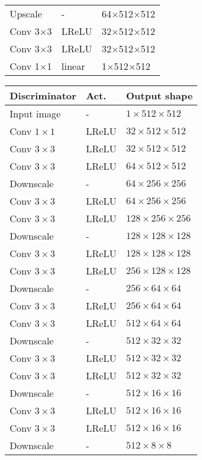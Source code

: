 \documentclass[journal, onecolumn]{IEEEtran}
\begin{document}
\begin{table}[H]
\begin{minipage}[t]{0.48\linewidth}
\begin{adjustbox}{width=0.72\columnwidth,left}
{\begin{tabular}[t]{|lll|}
Upscale          & -      & 64$\times$512$\times$512  \\
Conv 3$\times$3      & LReLU & 32$\times$512$\times$512      \\
Conv 3$\times$3      & LReLU & 32$\times$512$\times$512      \\ 
Conv 1$\times$1      & linear & 1$\times$512$\times$512      \\ \hline
\end{tabular}
}\hfill
\parbox[t][][t]{.4\linewidth}{
\begin{tabular}[t]{|lll|}
\hline
\textbf{Discriminator}       & Act.  & Output shape \\ \hline
Input image  & -      & $1\times512\times512$      \\
Conv $1\times1$      & LReLU & $32\times512\times512$      \\
Conv $3\times3$      & LReLU & $32\times512\times512$      \\ 
Conv $3\times3$      & LReLU & $64\times512\times512$     \\
Downscale & -      & $64\times256\times256$  \\ \hline

Conv $3\times3$      & LReLU & $64\times256\times256$      \\
Conv $3\times3$      & LReLU & $128\times256\times256$      \\ 
Downscale & -      & $128\times128\times128$  \\ \hline

Conv $3\times3$      & LReLU & $128\times128\times128$      \\
Conv $3\times3$      & LReLU & $256\times128\times128$      \\ 
Downscale & -      & $256\times64\times64$  \\ \hline

Conv $3\times3$      & LReLU & $256\times64\times64$      \\
Conv $3\times3$      & LReLU & $512\times64\times64$      \\ 
Downscale & -      & $512\times32\times32$  \\ \hline

Conv $3\times3$      & LReLU & $512\times32\times32$      \\
Conv $3\times3$      & LReLU & $512\times32\times32$      \\ 
Downscale & -      & $512\times16\times16$  \\ \hline

Conv $3\times3$      & LReLU & $512\times16\times16$      \\
Conv $3\times3$      & LReLU & $512\times16\times16$      \\ 
Downscale & -      & $512\times8\times8$  \\ \hline


\end{tabular}}
\end{adjustbox}
\end{minipage}
\end{table}
\end{document}
